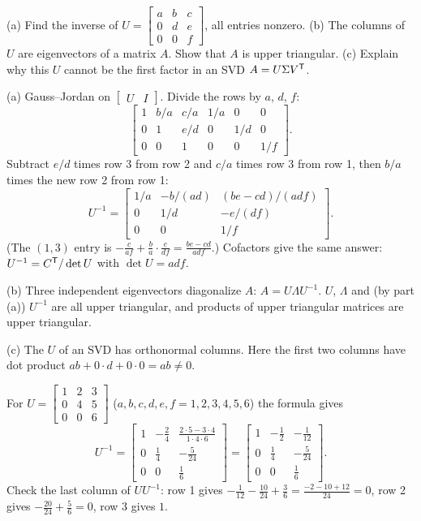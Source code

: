 \begin{exercise}[Question 2]\label{exr:u40-q2}
(a) Find the inverse of $U=\begin{bmatrix}a&b&c\\0&d&e\\0&0&f\end{bmatrix}$, all entries nonzero.
(b) The columns of $U$ are eigenvectors of a matrix $A$. Show that $A$ is upper triangular.
(c) Explain why this $U$ cannot be the first factor in an SVD $A=U\Sigma V^{\mathsf{T}}$.
\end{exercise}
\begin{solution}
(a) Gauss--Jordan on $\begin{bmatrix}U&I\end{bmatrix}$. Divide the rows by $a$, $d$, $f$:
\[
\left[\begin{array}{ccc|ccc}1&b/a&c/a&1/a&0&0\\0&1&e/d&0&1/d&0\\0&0&1&0&0&1/f\end{array}\right].
\]
Subtract $e/d$ times row 3 from row 2 and $c/a$ times row 3 from row 1, then $b/a$ times the new row 2 from row 1:
\[
U^{-1}=\begin{bmatrix}1/a&-b/(ad)&(be-cd)/(adf)\\0&1/d&-e/(df)\\0&0&1/f\end{bmatrix}.
\]
(The $(1,3)$ entry is $-\frac{c}{af}+\frac{b}{a}\cdot\frac{e}{df}=\frac{be-cd}{adf}$.) Cofactors give the same answer: $U^{-1}=C^{\mathsf{T}}/\det U$ with $\det U=adf$.

(b) Three independent eigenvectors diagonalize $A$: $A=U\Lambda U^{-1}$. $U$, $\Lambda$ and (by part (a)) $U^{-1}$ are all upper triangular, and products of upper triangular matrices are upper triangular.

(c) The $U$ of an SVD has orthonormal columns. Here the first two columns have dot product $ab+0\cdot d+0\cdot0=ab\neq0$.
\end{solution}

\begin{example}\label{ex:u40-tri}
For $U=\begin{bmatrix}1&2&3\\0&4&5\\0&0&6\end{bmatrix}$ ($a,b,c,d,e,f=1,2,3,4,5,6$) the formula gives
\[
U^{-1}=\begin{bmatrix}1&-\tfrac{2}{4}&\tfrac{2\cdot5-3\cdot4}{1\cdot4\cdot6}\\0&\tfrac14&-\tfrac{5}{24}\\0&0&\tfrac16\end{bmatrix}=\begin{bmatrix}1&-\tfrac12&-\tfrac{1}{12}\\0&\tfrac14&-\tfrac{5}{24}\\0&0&\tfrac16\end{bmatrix}.
\]
Check the last column of $UU^{-1}$: row 1 gives $-\tfrac{1}{12}-\tfrac{10}{24}+\tfrac36=\tfrac{-2-10+12}{24}=0$, row 2 gives $-\tfrac{20}{24}+\tfrac56=0$, row 3 gives $1$.
\end{example}

